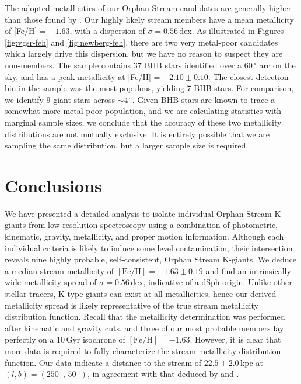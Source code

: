 \documentclass[10pt,apjl]{emulateapj}
\begin{document}
The adopted metallicities of our Orphan Stream candidates are generally higher than those found by \citet{Newberg_et-al_2010}. Our highly likely stream members have a mean metallicity of [Fe/H] = $-1.63$, with a dispersion of $\sigma = 0.56$\,dex. As illustrated in Figures \ref{fig:vgsr-feh} and \ref{fig:newberg-feh}, there are two very metal-poor candidates which largely drive this dispersion, but we have no reason to suspect they are non-members. The \citet{Newberg_et-al_2010} sample contains 37 BHB stars identified over a 60\,$^\circ$ arc on the sky, and has a peak metallicity at [Fe/H] = $-2.10 \pm 0.10$. The closest detection bin in the \citet{Newberg_et-al_2010} sample was the most populous, yielding 7 BHB stars. For comparison, we identify 9 giant stars across $\sim{}4\,^\circ$. Given BHB stars are known to trace a somewhat more metal-poor population, and we are calculating statistics with marginal sample sizes, we conclude that the accuracy of these two metallicity distributions are not mutually exclusive. It is entirely possible that we are sampling the same distribution, but a larger sample size is required.


\section{Conclusions}
\label{sec:conclusions}

We have presented a detailed analysis to isolate individual Orphan Stream K-giants from low-resolution spectroscopy using a combination of photometric, kinematic, gravity, metallicity, and proper motion information. Although each individual criteria is likely to induce some level contamination, their intersection reveals nine highly probable, self-consistent, Orphan Stream K-giants.  We deduce a median stream metallicity of $[\mbox{Fe/H}] = -1.63 \pm 0.19$ and find an intrinsically wide metallicity spread of $\sigma = 0.56$\,dex, indicative of a dSph origin. Unlike other stellar tracers, K-type giants can exist at all metallicities, hence our derived metallicity spread is likely representative of the true stream metallicity distribution function. Recall that the metallicity determination was performed after kinematic and gravity cuts, and three of our most probable members lay perfectly on a 10\,Gyr isochrone of $[\mbox{Fe/H}] = -1.63$. However, it is clear that more data is required to fully characterize the stream metallicity distribution function. Our data indicate a distance to the stream of $22.5 \pm 2.0$\,kpc at $(l, b) = (250\,^\circ,\,50\,^\circ)$, in agreement with that deduced by \citet{Grillmair_2006} and \citet{Newberg_et-al_2010}.
\end{document}
